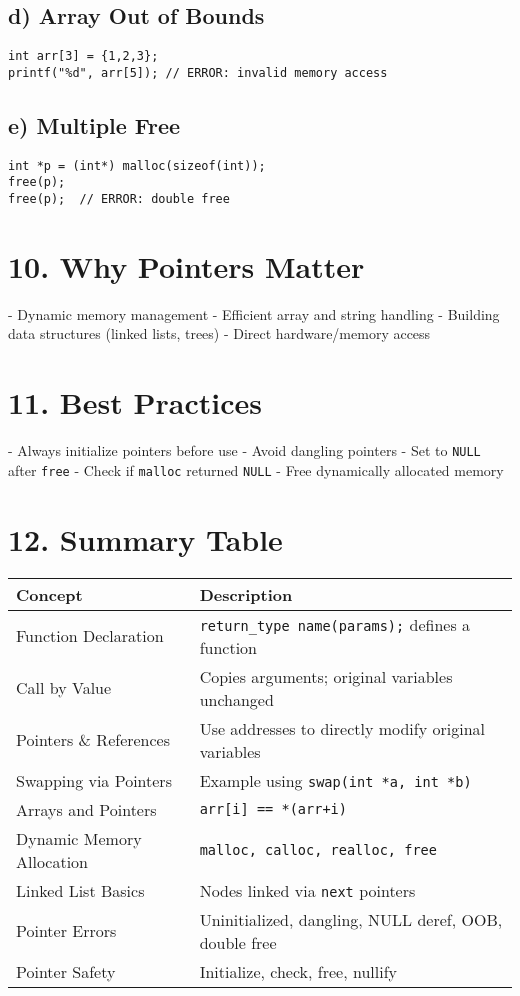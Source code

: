 \documentclass[a4paper,12pt]{article}
\begin{document}
\subsection*{d) Array Out of Bounds}
\begin{lstlisting}
int arr[3] = {1,2,3};
printf("%d", arr[5]); // ERROR: invalid memory access
\end{lstlisting}

\subsection*{e) Multiple Free}
\begin{lstlisting}
int *p = (int*) malloc(sizeof(int));
free(p);
free(p);  // ERROR: double free
\end{lstlisting}

\section*{10. Why Pointers Matter}
- Dynamic memory management  
- Efficient array and string handling  
- Building data structures (linked lists, trees)  
- Direct hardware/memory access  

\section*{11. Best Practices}
- Always initialize pointers before use  
- Avoid dangling pointers  
- Set to \verb|NULL| after \verb|free|  
- Check if \verb|malloc| returned \verb|NULL|  
- Free dynamically allocated memory  

\section*{12. Summary Table}
\renewcommand{\arraystretch}{1.3}
\begin{tabular}{|m{4cm}|m{9cm}|}
\hline
\textbf{Concept} & \textbf{Description} \\
\hline
Function Declaration & \verb|return_type name(params);| defines a function \\
\hline
Call by Value & Copies arguments; original variables unchanged \\
\hline
Pointers \& References & Use addresses to directly modify original variables \\
\hline
Swapping via Pointers & Example using \verb|swap(int *a, int *b)| \\
\hline
Arrays and Pointers & \verb|arr[i] == *(arr+i)| \\
\hline
Dynamic Memory Allocation & \verb|malloc, calloc, realloc, free| \\
\hline
Linked List Basics & Nodes linked via \verb|next| pointers \\
\hline
Pointer Errors & Uninitialized, dangling, NULL deref, OOB, double free \\
\hline
Pointer Safety & Initialize, check, free, nullify \\
\hline
\end{tabular}
\end{document}
